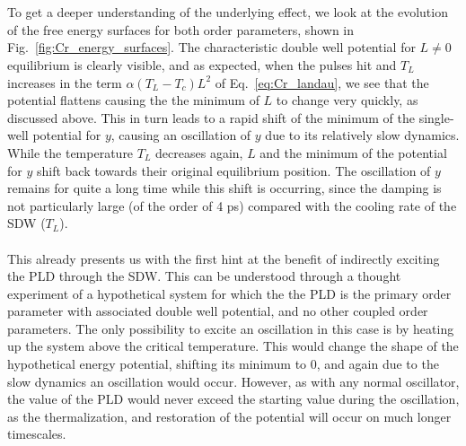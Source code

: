 \\\\
To get a deeper understanding of the underlying effect, we look at the evolution of the free energy surfaces for both order parameters, shown in Fig.~\ref{fig:Cr_energy_surfaces}.
The characteristic double well potential for $L\neq0$ equilibrium is clearly visible, and as expected, when the pulses hit and $T_L$ increases in the term $\alpha(T_L-T_c)L^2$ of Eq.~\eqref{eq:Cr_landau}, we see that the potential flattens causing the the minimum of $L$ to change very quickly, as discussed above.
This in turn leads to a rapid shift of the minimum of the single-well potential for $y$, causing an oscillation of $y$ due to its relatively slow dynamics.
While the temperature $T_L$ decreases again, $L$ and the minimum of the potential for $y$ shift back towards their original equilibrium position.
The oscillation of $y$ remains for quite a long time while this shift is occurring, since the damping is not particularly large (of the order of 4 ps) compared with the cooling rate of the SDW ($T_L$).
\\\\
This already presents us with the first hint at the benefit of indirectly exciting the PLD through the SDW.
This can be understood through a thought experiment of a hypothetical system for which the the PLD is the primary order parameter with associated double well potential, and no other coupled order parameters.
The only possibility to excite an oscillation in this case is by heating up the system above the critical temperature.
This would change the shape of the hypothetical energy potential, shifting its minimum to 0, and again due to the slow dynamics an oscillation would occur.
However, as with any normal oscillator, the value of the PLD would never exceed the starting value during the oscillation, as the thermalization, and restoration of the potential will occur on much longer timescales.

